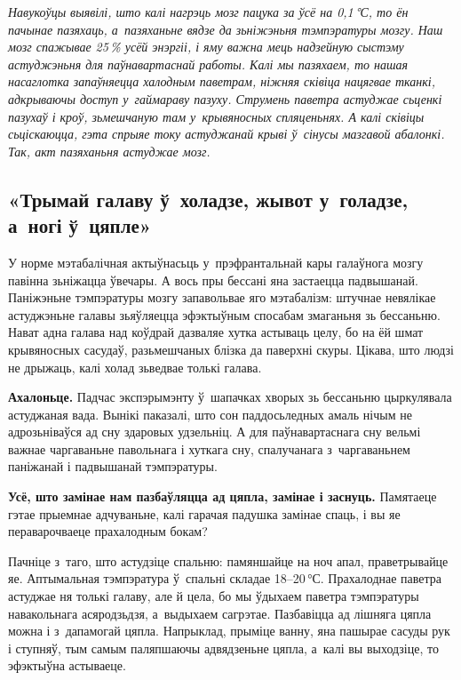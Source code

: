 
\emph{Навукоўцы выявілі, што калі нагрэць мозг пацука за ўсё на 0,1\,°С, то ён пачынае пазяхаць, а~пазяханьне вядзе да зьніжэньня тэмпэратуры мозгу. Наш мозг спажывае 25\,\% усёй энэргіі, і яму важна мець надзейную сыстэму астуджэньня для паўнавартаснай работы. Калі мы пазяхаем, то нашая насаглотка запаўняецца халодным паветрам, ніжняя сківіца нацягвае тканкі, адкрываючы доступ у~гаймараву пазуху. Струмень паветра астуджае сьценкі пазухаў і кроў, зьмешчаную там у~крывяносных спляценьнях. А калі сківіцы сьціскаюцца, гэта спрыяе току астуджанай крыві ў~сінусы мазгавой абалонкі. Так, акт пазяханьня астуджае мозг.}

\subsection*{«Трымай галаву ў~холадзе, жывот у~голадзе, а~ногі ў~цяпле»}

У норме мэтабалічная актыўнасьць у~прэфрантальнай кары галаўнога мозгу павінна зьніжацца ўвечары. А вось пры бессані яна застаецца падвышанай. Паніжэньне тэмпэратуры мозгу запавольвае яго мэтабалізм: штучнае невялікае астуджэньне галавы зьяўляецца эфэктыўным спосабам змаганьня зь бессаньню. Нават адна галава над коўдрай дазваляе хутка астываць целу, бо на ёй шмат крывяносных сасудаў, разьмешчаных блізка да паверхні скуры. Цікава, што людзі не дрыжаць, калі холад зьведвае толькі галава.

\textbf{Ахалоньце.} Падчас экспэрымэнту ў~шапачках хворых зь бессаньню цыркулявала астуджаная вада. Вынікі паказалі, што сон паддосьледных амаль нічым не адрозьніваўся ад сну здаровых удзельніц. А для паўнавартаснага сну вельмі важнае чаргаваньне павольнага і хуткага сну, спалучанага з~чаргаваньнем паніжанай і падвышанай тэмпэратуры. 

\textbf{Усё, што замінае нам пазбаўляцца ад цяпла, замінае і заснуць.} Памятаеце гэтае прыемнае адчуваньне, калі гарачая падушка замінае спаць, і вы яе пераварочваеце прахалодным бокам?

Пачніце з~таго, што астудзіце спальню: памяншайце на ноч апал, праветрывайце яе. Аптымальная тэмпэратура ў~спальні складае 18--20\,°С. Прахалоднае паветра астуджае ня толькі галаву, але й цела, бо мы ўдыхаем паветра тэмпэратуры навакольнага асяродзьдзя, а~выдыхаем сагрэтае. Пазбавіцца ад лішняга цяпла можна і з~дапамогай цяпла. Напрыклад, прыміце ванну, яна пашырае сасуды рук і ступняў, тым самым паляпшаючы адвядзеньне цяпла, а~калі вы выходзіце, то эфэктыўна астываеце.

